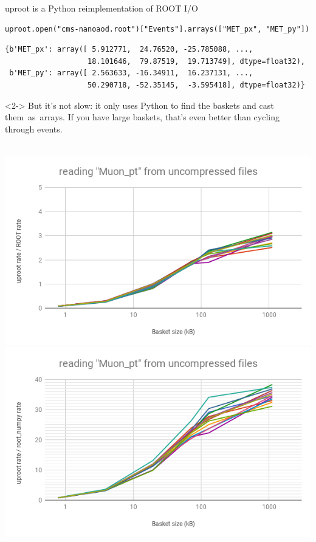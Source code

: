\documentclass[aspectratio=169]{beamer}
\begin{document}
\begin{frame}[fragile]{uproot is a Python reimplementation of ROOT I/O}
\small
\vspace{0.25 cm}

\begin{verbatim}
uproot.open("cms-nanoaod.root")["Events"].arrays(["MET_px", "MET_py"])
\end{verbatim}
\color{darkblue}\vspace{-0.5\baselineskip}\begin{verbatim}
{b'MET_px': array([ 5.912771,  24.76520, -25.785088, ...,
                   18.101646,  79.87519,  19.713749], dtype=float32),
 b'MET_py': array([ 2.563633, -16.34911,  16.237131, ...,
                   50.290718, -52.35145,  -3.595418], dtype=float32)}
\end{verbatim}
\color{black}

\large
\begin{uncoverenv}<2->
But it's not slow: it only uses Python to find the baskets and cast \mbox{them as arrays.\hspace{-0.25 cm}} If you have large baskets, that's even better than cycling through events.

\mbox{ } \hfill \includegraphics[width=0.45\linewidth]{root-none-muon.png} \hfill \includegraphics[width=0.45\linewidth]{rootnumpy-none-muon.png} \hfill \mbox{ }
\end{uncoverenv}
\end{frame}
\end{document}
